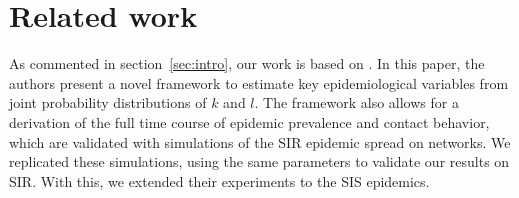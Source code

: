 \section{Related work}
As commented in section~\ref{sec:intro}, our work is based on \cite{10.1371/journal.pcbi.1003352}. In this paper, the authors present a novel framework to estimate key epidemiological variables from joint probability distributions of $k$ and $l$. The framework also allows for a derivation of the full time course of epidemic prevalence and contact behavior, which are validated with simulations of the SIR epidemic spread on networks. We replicated these simulations, using the same parameters to validate our results on SIR. With this, we extended their experiments to the SIS epidemics.